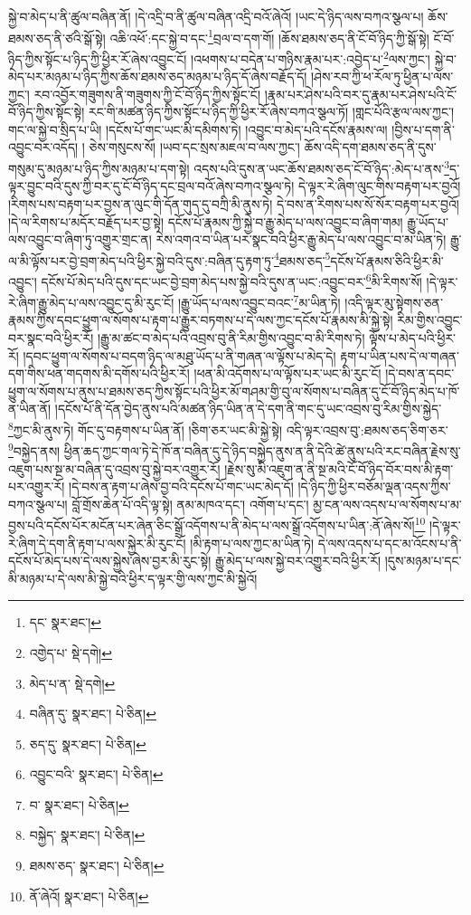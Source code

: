 སྐྱེ་བ་མེད་པ་ནི་ཚུལ་བཞིན་ནོ། །དེ་འདྲི་བ་ནི་ཚུལ་བཞིན་འདྲི་བའོ་ཞེའོ། །ཡང་དེ་ཉིད་ལས་བཀའ་སྩལ་པ། ཆོས་ཐམས་ཅད་ནི་ཙའི་སྒོ་སྟེ། འཆི་འཕོ་:དང་སྐྱེ་བ་དང་\footnote{དང་  སྣར་ཐང་། }བྲལ་བ་དག་གོ། །ཆོས་ཐམས་ཅད་ནི་ངོ་བོ་ཉིད་ཀྱི་སྒོ་སྟེ། ངོ་བོ་ཉིད་ཀྱིས་སྟོང་པ་ཉིད་ཀྱི་ཕྱིར་རོ་ཞེས་འབྱུང་ངོ། །འཕགས་པ་བདེན་པ་གཉིས་རྣམ་པར་:འབྱེད་པ་\footnote{འགྱེད་པ་  སྡེ་དགེ། }ལས་ཀྱང་། སྐྱེ་བ་མེད་པར་མཉམ་པ་ཉིད་ཀྱིས་ཆོས་ཐམས་ཅད་མཉམ་པ་ཉིད་དོ་ཞེས་བརྗོད་དོ། །ཤེས་རབ་ཀྱི་ཕ་རོལ་ཏུ་ཕྱིན་པ་ལས་ཀྱང་། རབ་འབྱོར་གཟུགས་ནི་གཟུགས་ཀྱི་ངོ་བོ་ཉིད་ཀྱིས་སྟོང་ངོ། །རྣམ་པར་ཤེས་པའི་བར་དུ་རྣམ་པར་ཤེས་པའི་ངོ་བོ་ཉིད་ཀྱིས་སྟོང་སྟེ། རང་གི་མཚན་ཉིད་ཀྱིས་སྟོང་པ་ཉིད་ཀྱི་ཕྱིར་རོ་ཞེས་བཀའ་སྩལ་ཏོ། །གླང་པོའི་རྩལ་ལས་ཀྱང་། གང་ལ་སྐྱེ་བ་སྲིད་པ་ཡི། །དངོས་པོ་གང་ཡང་མི་དམིགས་ཏེ། །འབྱུང་བ་མེད་པའི་དངོས་རྣམས་ལ། །བྱིས་པ་དག་ནི་འབྱུང་བར་འདོད། །
ཅེས་གསུངས་སོ། །ཡབ་དང་སྲས་མཇལ་བ་ལས་ཀྱང་། ཆོས་འདི་དག་ཐམས་ཅད་ནི་དུས་གསུམ་དུ་མཉམ་པ་ཉིད་ཀྱིས་མཉམ་པ་དག་སྟེ། འདས་པའི་དུས་ན་ཡང་ཆོས་ཐམས་ཅད་ངོ་བོ་ཉིད་:མེད་པ་ནས་\footnote{མེད་པ་ན་  སྡེ་དགེ། }ད་ལྟར་བྱུང་བའི་དུས་ཀྱི་བར་དུ་ངོ་བོ་ཉིད་དང་བྲལ་བའོ་ཞེས་བཀའ་སྩལ་ཏེ། དེ་ལྟར་རེ་ཞིག་ལུང་གིས་བརྟག་པར་བྱའོ། །རིགས་པས་བརྟག་པར་བྱས་ན་ལུང་གི་དོན་གུད་དུ་བཀྲི་མི་ནུས་ཏེ། དེ་བས་ན་རིགས་པས་སོ་སོར་བརྟག་པར་བྱའོ། །དེ་ལ་རིགས་པ་མདོར་བརྗོད་པར་བྱ་སྟེ། དངོས་པོ་རྣམས་ཀྱི་སྐྱེ་བ་རྒྱུ་མེད་པ་ལས་འབྱུང་བ་ཞིག་གམ། རྒྱུ་ཡོད་པ་ལས་འབྱུང་བ་ཞིག་ཏུ་འགྱུར་གྲང་ན། རེས་འགའ་བ་ཡིན་པར་སྣང་བའི་ཕྱིར་རྒྱུ་མེད་པ་ལས་འབྱུང་བ་མ་ཡིན་ཏེ། རྒྱུ་ལ་མི་ལྟོས་པར་བྱེ་བྲག་མེད་པའི་ཕྱིར་སྐྱེ་བའི་དུས་:བཞིན་དུ་རྟག་ཏུ་\footnote{བཞིན་དུ་  སྣར་ཐང་།  པེ་ཅིན། }ཐམས་ཅད་\footnote{ཅད་དུ་  སྣར་ཐང་།  པེ་ཅིན། }དངོས་པོ་རྣམས་ཅིའི་ཕྱིར་མི་འབྱུང་། དངོས་པོ་མེད་པའི་དུས་དང་ཡང་བྱེ་བྲག་མེད་པས་སྐྱེ་བའི་དུས་ན་ཡང་:འབྱུང་བར་\footnote{འབྱུང་བའི་  སྣར་ཐང་།  པེ་ཅིན། }མི་རིགས་སོ། །དེ་ལྟར་རེ་ཞིག་རྒྱུ་མེད་པ་ལས་འབྱུང་དུ་མི་རུང་ངོ། །རྒྱུ་ཡོད་པ་ལས་འབྱུང་བའང་\footnote{བ་  སྣར་ཐང་།  པེ་ཅིན། }མ་ཡིན་ཏེ། །འདི་ལྟར་མུ་སྟེགས་ཅན་རྣམས་ཀྱིས་དབང་ཕྱུག་ལ་སོགས་པ་རྟག་པ་རྒྱུར་བཏགས་པ་དེ་ལས་ཀྱང་དངོས་པོ་རྣམས་མི་སྐྱེ་སྟེ། རིམ་གྱིས་འབྱུང་བར་སྣང་བའི་ཕྱིར་རོ། །རྒྱུ་མ་ཚང་བ་མེད་པའི་འབྲས་བུ་ནི་རིམ་གྱིས་འབྱུང་བ་མི་རིགས་ཏེ། ལྟོས་པ་མེད་པའི་ཕྱིར་རོ། །དབང་ཕྱུག་ལ་སོགས་པ་བདག་ཉིད་ལ་མཐུ་ཡོད་པ་ནི་གཞན་ལ་ལྟོས་པ་མེད་དེ། རྟག་པ་ཡིན་པས་དེ་ལ་གཞན་དག་གིས་ཕན་གདགས་མི་དགོས་པའི་ཕྱིར་རོ། །ཕན་མི་འདོགས་པ་ལ་ལྟོས་པར་ཡང་མི་རུང་ངོ། །དེ་བས་ན་དབང་ཕྱུག་ལ་སོགས་པ་ནུས་པ་ཐམས་ཅད་ཀྱིས་སྟོང་པའི་ཕྱིར་མོ་གཤམ་གྱི་བུ་ལ་སོགས་པ་བཞིན་དུ་ངོ་བོ་ཉིད་མེད་པ་ཁོ་ན་ཡིན་ནོ། །དངོས་པོ་ནི་དོན་བྱེད་ནུས་པའི་མཚན་ཉིད་ཡིན་ན་དེ་དག་ནི་གང་དུ་ཡང་འབྲས་བུ་རིམ་གྱིས་སྐྱེད་\footnote{བསྐྱེད་  སྣར་ཐང་།  པེ་ཅིན། }ཀྱང་མི་ནུས་ཏེ། གོང་དུ་བརྟགས་པ་ཡིན་ནོ། །ཅིག་ཅར་ཡང་མི་སྐྱེ་སྟེ། འདི་ལྟར་འབྲས་བུ་:ཐམས་ཅད་ཅིག་ཅར་\footnote{ཐམས་ཅད་  སྣར་ཐང་།  པེ་ཅིན། }བསྐྱེད་ནས། ཕྱིན་ཆད་ཀྱང་གལ་ཏེ་དེ་ཁོ་ན་བཞིན་དུ་དེ་ཉིད་བསྐྱེད་ནུས་ན་ནི་དེའི་ཚེ་ནུས་པའི་རང་བཞིན་རྗེས་སུ་འཇུག་པས་སྔ་མ་བཞིན་དུ་འབྲས་བུ་སྐྱེ་བར་འགྱུར་རོ། །རྗེས་སུ་མི་འཇུག་ན་ནི་སྔ་མའི་ངོ་བོ་ཉིད་བོར་བས་མི་རྟག་པར་འགྱུར་རོ། །དེ་བས་ན་རྟག་པ་ཞེས་བྱ་བའི་དངོས་པོ་གང་ཡང་མེད་དོ། །དེ་ཉིད་ཀྱི་ཕྱིར་བཅོམ་ལྡན་འདས་ཀྱིས་བཀའ་སྩལ་པ། བློ་གྲོས་ཆེན་པོ་འདི་ལྟ་སྟེ། ནམ་མཁའ་དང་། འགོག་པ་དང་། མྱ་ངན་ལས་འདས་པ་ལ་སོགས་པ་མ་བྱས་པའི་དངོས་པོར་མངོན་པར་ཞེན་ཅིང་སྒྲོ་འདོགས་པ་ནི་མེད་པ་ལས་སྒྲོ་འདོགས་པ་ཡིན་:ནོ་ཞེས་སོ།\footnote{ནོ་ཞེའོ།  སྣར་ཐང་།  པེ་ཅིན། } །དེ་ལྟར་རེ་ཞིག་དེ་དག་ནི་རྟག་པ་ལས་སྐྱེར་མི་རུང་ངོ། །མི་རྟག་པ་ལས་ཀྱང་མ་ཡིན་ཏེ། དེ་ལས་འདས་པ་དང་མ་འོངས་པ་ནི་དངོས་པོ་མེད་པས་དེ་ལས་སྐྱེས་ཞེས་བྱར་མི་རུང་སྟེ། རྒྱུ་མེད་པ་ལས་སྐྱེ་བར་འགྱུར་བའི་ཕྱིར་རོ། །དུས་མཉམ་པ་དང་མི་མཉམ་པ་དེ་ལས་མི་སྐྱེ་བའི་ཕྱིར་ད་ལྟར་གྱི་ལས་ཀྱང་མི་སྐྱེའོ། 